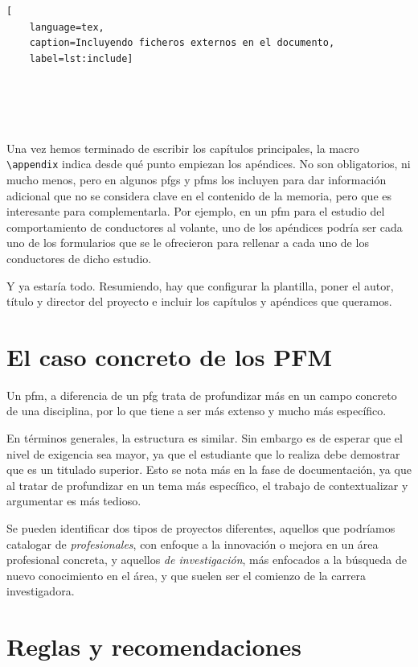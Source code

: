 \documentclass[%
    school=etsisi,%
    type=pfg,%
    degree=61CI,%
]{upm-report}
\begin{document}
\begin{lstlisting}[
    language=tex,
    caption=Incluyendo ficheros externos en el documento,
    label=lst:include]





\end{lstlisting}

Una vez hemos terminado de escribir los capítulos principales, la macro
\lstinline{\appendix} indica desde qué punto empiezan los apéndices. No
son obligatorios, ni mucho menos, pero en algunos \glspl{pfg} y
\glspl{pfm} los incluyen para dar información adicional que no se
considera clave en el contenido de la memoria, pero que es interesante
para complementarla. Por ejemplo, en un \gls{pfm} para el estudio del
comportamiento de conductores al volante, uno de los apéndices podría
ser cada uno de los formularios que se le ofrecieron para rellenar a
cada uno de los conductores de dicho estudio.

Y ya estaría todo. Resumiendo, hay que configurar la plantilla, poner
el autor, título y director del proyecto e incluir los capítulos y
apéndices que queramos.

\section{El caso concreto de los PFM}

Un \gls{pfm}, a diferencia de un \gls{pfg} trata de profundizar más en
un campo concreto de una disciplina, por lo que tiene a ser más extenso
y mucho más específico.

En términos generales, la estructura es similar. Sin embargo es de
esperar que el nivel de exigencia sea mayor, ya que el estudiante que
lo realiza debe demostrar que es un titulado superior. Esto se nota más
en la fase de documentación, ya que al tratar de profundizar en un tema
más específico, el trabajo de contextualizar y argumentar es más
tedioso.

Se pueden identificar dos tipos de proyectos diferentes, aquellos que
podríamos catalogar de \textit{profesionales}, con enfoque a la
innovación o mejora en un área profesional concreta, y aquellos
\textit{de investigación}, más enfocados a la búsqueda de nuevo
conocimiento en el área, y que suelen ser el comienzo de la carrera
investigadora.

\section{Reglas y recomendaciones}
\end{document}
